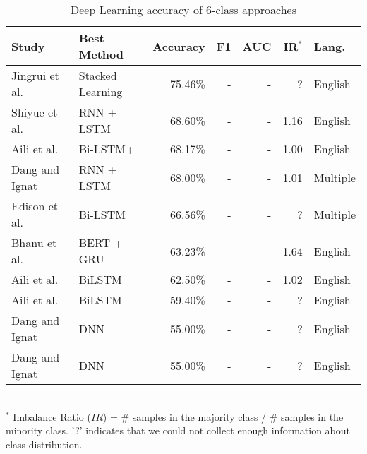 \begin{table}[ht]
    \caption{Deep Learning accuracy of 6-class approaches }
    \label{tab:DL_performance_6class}
    \centering
    \begin{tabular}{m{} l r r r r l}
        \toprule
        \textbf{Study} & \textbf{Best Method} & \textbf{Accuracy} & \textbf{F1} & \textbf{AUC} & \textbf{IR$^*$} & \textbf{Lang.} \\ 
        \midrule
        Jingrui et al.~\cite{Hou2021_lr122} & Stacked Learning & 75.46\% & - & - & ? & English \\
        Shiyue et al.~\cite{Zhang2018_lr41} & RNN + LSTM & 68.60\% & - & - & 1.16 & English \\
        Aili et al.~\cite{Shen2017_lr31} & Bi-LSTM+ & 68.17\% & - & - & 1.00 & English \\
        Dang and Ignat~\cite{Dang2017_lr23} & RNN + LSTM & 68.00\% & - & - & 1.01 & Multiple \\
        Edison et al.~\cite{Marrese-Taylor2019_lr85} & Bi-LSTM & 66.56\% & - & - & ? & Multiple \\
        Bhanu et al.~\cite{Guda2020_lr38} & BERT + GRU & 63.23\% & - & - & 1.64 & English \\
        Aili et al.~\cite{Shen2020_lr2009} & BiLSTM & 62.50\% & - & - & 1.02 & English \\
        Aili et al.~\cite{Shen2019_lr1061} & BiLSTM & 59.40\% & - & - & ? & English \\
        Dang and Ignat~\cite{Dang2016_lr24} & DNN & 55.00\% & - & - & ? & English \\
        Dang and Ignat~\cite{Dang2016_lr89} & DNN & 55.00\% & - & - & ? & English \\
        \bottomrule
    \end{tabular}
    \\ \vspace{0.1cm}
    \footnotesize
    $^*$ Imbalance Ratio ($IR$) = \# samples in the majority class / \# samples in the minority class. '?' indicates that we could not collect enough information about class distribution.
\end{table}